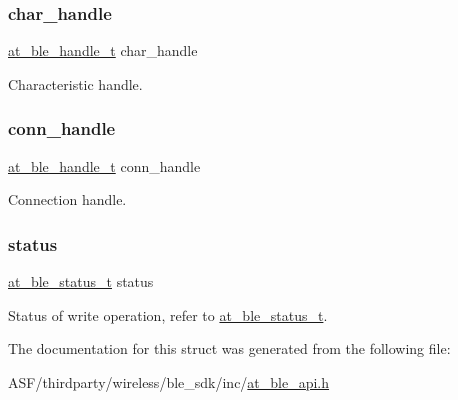 \subsubsection{\texorpdfstring{char\_handle}{char\_handle}}
{\footnotesize\ttfamily \mbox{\hyperlink{at__ble__api_8h_abd23646d0c662860741f787efc8456f2}{at\+\_\+ble\+\_\+handle\+\_\+t}} char\+\_\+handle}



Characteristic handle. 

\mbox{\label{structat__ble__characteristic__write__response__t_ae42df6fd8493f8f8faeccfdd6062e96f}} 
\subsubsection{\texorpdfstring{conn\_handle}{conn\_handle}}
{\footnotesize\ttfamily \mbox{\hyperlink{at__ble__api_8h_abd23646d0c662860741f787efc8456f2}{at\+\_\+ble\+\_\+handle\+\_\+t}} conn\+\_\+handle}



Connection handle. 

\mbox{\label{structat__ble__characteristic__write__response__t_a0b48093fc2030779fc47e5216f8019e2}} 
\subsubsection{\texorpdfstring{status}{status}}
{\footnotesize\ttfamily \mbox{\hyperlink{group__error__codes__group_ga3b1db9b95feb157b3c188ca27fe76988}{at\+\_\+ble\+\_\+status\+\_\+t}} status}



Status of write operation, refer to \mbox{\hyperlink{at__ble__api_8h_ace24eb4e5ca3f325c663b809da5feb92}{at\+\_\+ble\+\_\+status\+\_\+t}}. 



The documentation for this struct was generated from the following file\+:\begin{DoxyCompactItemize}
\item 
A\+S\+F/thirdparty/wireless/ble\+\_\+sdk/inc/\mbox{\hyperlink{at__ble__api_8h}{at\+\_\+ble\+\_\+api.\+h}}\end{DoxyCompactItemize}
